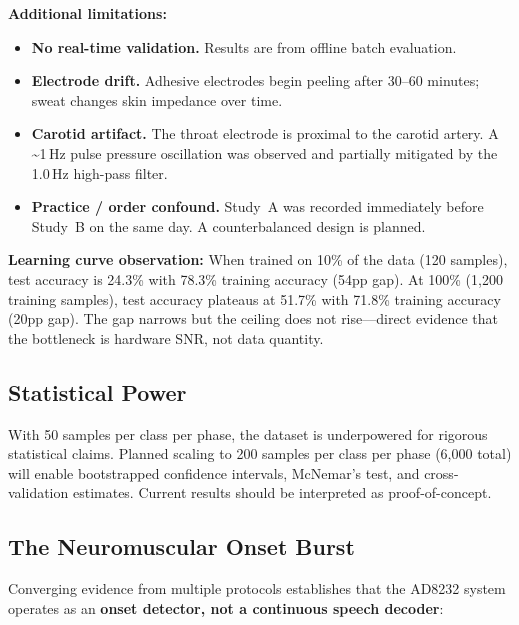 \documentclass[11pt, a4paper]{article}
\begin{document}
\textbf{Additional limitations:}
\begin{itemize}
    \item \textbf{No real-time validation.} Results are from offline batch evaluation.
    \item \textbf{Electrode drift.} Adhesive electrodes begin peeling after 30--60 minutes; sweat changes skin impedance over time.
    \item \textbf{Carotid artifact.} The throat electrode is proximal to the carotid artery. A \textasciitilde1\,Hz pulse pressure oscillation was observed and partially mitigated by the 1.0\,Hz high-pass filter.
    \item \textbf{Practice / order confound.} Study~A was recorded immediately before Study~B on the same day. A counterbalanced design is planned.
\end{itemize}

\label{fig:lcurve_note}
\textbf{Learning curve observation:} When trained on 10\% of the data (120 samples), test accuracy is 24.3\% with 78.3\% training accuracy (54pp gap). At 100\% (1{,}200 training samples), test accuracy plateaus at 51.7\% with 71.8\% training accuracy (20pp gap). The gap narrows but the ceiling does not rise---direct evidence that the bottleneck is hardware SNR, not data quantity.

\subsection{Statistical Power}

With 50 samples per class per phase, the dataset is underpowered for rigorous statistical claims. Planned scaling to 200 samples per class per phase (6{,}000 total) will enable bootstrapped confidence intervals, McNemar's test, and cross-validation estimates. Current results should be interpreted as proof-of-concept.

\subsection{The Neuromuscular Onset Burst}
\label{sec:onset}

Converging evidence from multiple protocols establishes that the AD8232 system operates as an \textbf{onset detector, not a continuous speech decoder}:
\end{document}
